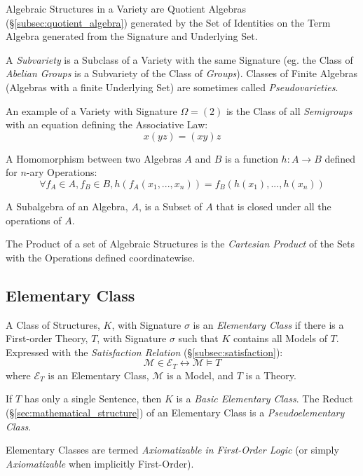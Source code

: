 Algebraic Structures in a Variety are Quotient Algebras
(\S\ref{subsec:quotient_algebra}) generated by the Set of Identities
on the Term Algebra generated from the Signature and Underlying Set.

A \emph{Subvariety} is a Subclass of a Variety with the same Signature
(eg. the Class of \emph{Abelian Groups} is a Subvariety of the Class
of \emph{Groups}). Classes of Finite Algebras (Algebras with a finite
Underlying Set) are sometimes called \emph{Pseudovarieties}.

An example of a Variety with Signature $\Omega = (2)$ is the Class of
all \emph{Semigroups} with an equation defining the Associative Law:
\[
    x(yz) = (xy)z
\]

A Homomorphism between two Algebras $A$ and $B$ is a function $h: A
\rightarrow B$ defined for $n$-ary Operations:
\[
\forall f_A \in A, f_B \in B, h(f_A(x_1, ..., x_n)) = f_B(h(x_1), ...,
h(x_n))
\]

A Subalgebra of an Algebra, $A$, is a Subset of $A$ that is closed
under all the operations of $A$.

The Product of a set of Algebraic Structures is the \emph{Cartesian
  Product} of the Sets with the Operations defined coordinatewise.

\subsection{Elementary Class}\label{subsec:elementary_class}

A Class of Structures, $K$, with Signature $\sigma$ is an
\emph{Elementary Class} if there is a First-order Theory, $T$, with
Signature $\sigma$ such that $K$ contains all Models of $T$.
Expressed with the \emph{Satisfaction Relation}
(\S\ref{subsec:satisfaction}):
\[
    \mathcal{M} \in \mathcal{E}_T \leftrightarrow \mathcal{M} \vDash T
\]
where $\mathcal{E}_T$ is an Elementary Class, $\mathcal{M}$ is a
Model, and $T$ is a Theory.

If $T$ has only a single Sentence, then $K$ is a \emph{Basic
  Elementary Class}. The Reduct (\S\ref{sec:mathematical_structure})
of an Elementary Class is a \emph{Pseudoelementary Class}.

Elementary Classes are termed \emph{Axiomatizable in First-Order
  Logic} (or simply \emph{Axiomatizable} when implicitly First-Order).

